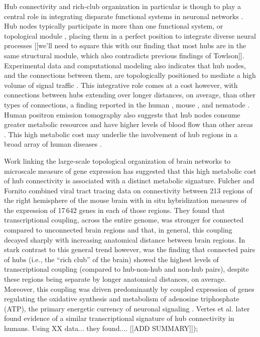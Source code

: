\documentclass[10pt,letterpaper]{article}
\begin{document}
Hub connectivity and rich-club organization in particular is though to play a central role in integrating disparate functional systems in neuronal networks \cite{Fornito:2015dq, VandenHeuvel2013a, ZamoraLopez:2010hy, Crossley2014, Crossley:2013kl}.
Hub nodes typically participate in more than one functional system, or topological module \cite{deReus:2013cy, deReus:2014cz, ZamoraLopez:2010hy}, placing them in a perfect position to integrate diverse neural processes [[we'll need to square this with our finding that most hubs are in the same structural module, which also contradicts previous findings of Towlson]].
Experimental data and computational modeling also indicates that hub nodes, and the connections between them, are topologically positioned to mediate a high volume of signal traffic \cite{vandenHeuvel:2012kh, Harriger:2012bb, Misic:2014it, Misic:2015jw}.
This integrative role comes at a cost however, with connections between hubs extending over longer distances, on average, than other types of connections, a finding reported in the human \cite{vandenHeuvel:2012kh}, mouse \cite{Fulcher:2016ck}, and nematode \cite{Towlson:2013gf}.
Human positron emission tomography also suggests that hub nodes consume greater metabolic resources and have higher levels of blood flow than other areas \cite{Tomasi:2013kl, Collin:2014kq, Liang2013a}.
This high metabolic cost may underlie the involvement of hub regions in a broad array of human diseases \cite{Fornito2015, Bullmore:2012vl, Crossley:2014eta}.

Work linking the large-scale topological organization of brain networks to microscale measure of gene expression has suggested that this high metabolic cost of hub connectivity is associated with a distinct metabolic signature.
Fulcher and Fornito \cite{Fulcher:2016ck} combined viral tract tracing data on connectivity between 213 regions of the right hemisphere of the mouse brain \cite{Oh2014} with in situ hybridization measures of the expression of 17\,642 genes in each of those regions.
They found that transcriptional coupling, across the entire genome, was stronger for connected compared to unconnected brain regions and that, in general, this coupling decayed sharply with increasing anatomical distance between brain regions.
In stark contrast to this general trend however, was the finding that connected pairs of hubs (i.e., the ``rich club'' of the brain) showed the highest levels of transcriptional coupling (compared to hub-non-hub and non-hub pairs), despite these regions being separate by longer anatomical distances, on average.
Moreover, this coupling was driven predominantly by coupled expression of genes regulating the oxidative synthesis and metabolism of adenosine triphosphate (ATP), the primary energetic currency of neuronal signaling \cite{Lennie:2003ia, Laughlin:2003vu}.
Vertes et al. \cite{Vertes2016a} later found evidence of a similar transcriptional signature of hub connectivity in humans. Using XX data... they found.... [[ADD SUMMARY]]);
\end{document}
